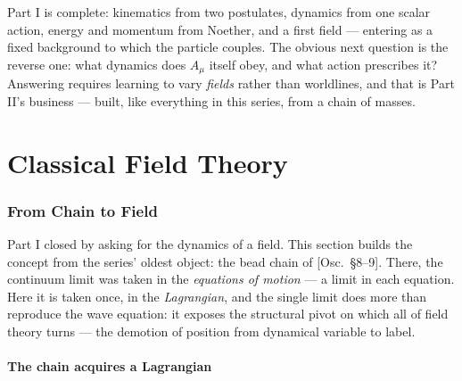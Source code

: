 \documentclass[11pt]{article}
\theoremstyle{plain}
\theoremstyle{definition}
\theoremstyle{remark}
\begin{document}
\medskip
\noindent
Part I is complete: kinematics from two postulates, dynamics from one
scalar action, energy and momentum from Noether, and a first field ---
entering as a fixed background to which the particle couples. The
obvious next question is the reverse one: what
dynamics does $A_\mu$ itself obey, and what action prescribes it?
Answering requires learning to vary \emph{fields} rather than
worldlines, and that is Part II's business --- built, like everything
in this series, from a chain of masses.

\clearpage
\part{Classical Field Theory}

\section{From Chain to Field}
\label{sec:chain-to-field}

Part I closed by asking for the dynamics of a field. This section
builds the concept from the series' oldest object: the bead chain
of [Osc.\ \S8--9]. There, the continuum limit was taken in the
\emph{equations of motion} --- a limit in each equation. Here
it is taken once, in the \emph{Lagrangian}, and the single limit does
more than reproduce the wave equation: it exposes the structural pivot
on which all of field theory turns --- the demotion of position from
dynamical variable to label.

\subsection{The chain acquires a Lagrangian}
\label{sec:chain-lagrangian}
\end{document}
